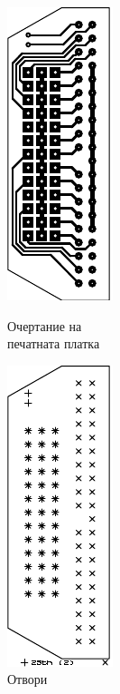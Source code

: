 \begin{figure}[!htbp]
    \begin{minipage}{0.49\linewidth}
        \centering
        \includegraphics[page=7]{documents/pata_board.pdf}
        \caption{Очертание на\\печатната платка}
        \label{fig:pata_cont}
    \end{minipage}
    \hfill
    \begin{minipage}{0.49\linewidth}
        \centering
        \includegraphics[page=1]{documents/pata_board_drill.pdf}
        \caption{Отвори}
        \label{fig:pata_drill}
    \end{minipage}
\end{figure}
\FloatBarrier
